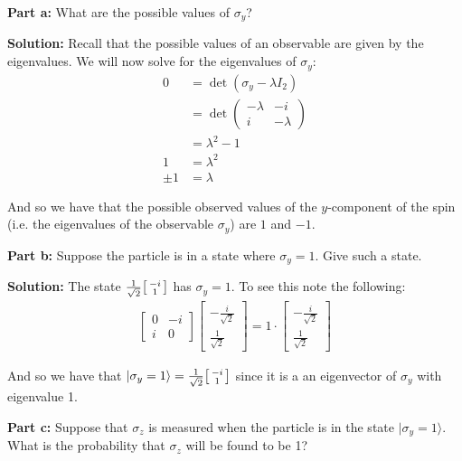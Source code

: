 \documentclass{article}
\newcommand{\icol}[1]{%
  \begin{bsmallmatrix}#1\end{bsmallmatrix}%
}
\begin{document}
\noindent\textbf{Part a:} What are the possible values of $\sigma_y$?
\bigskip

\noindent\textbf{Solution:} Recall that the possible values of an observable are given by the eigenvalues. We will now solve for the eigenvalues of $\sigma_y$:
\begin{align*}
    0&=\det(\sigma_y-\lambda I_2)\tag{characteristic equation}\\
    &=\det\begin{pmatrix}
        -\lambda&-i\\i&-\lambda
    \end{pmatrix}\\
    &=\lambda^2-1\tag{det. of $2\times2$ matrix}\\
    1&=\lambda^2\\
    \pm 1&=\lambda
\end{align*}

And so we have that the possible observed values of the $y$-component of the spin (i.e. the eigenvalues of the observable $\sigma_y$) are $1$ and $-1$.
\bigskip

\noindent\textbf{Part b:} Suppose the particle is in a state where $\sigma_y=1$. Give such a state.
\bigskip

\noindent\textbf{Solution:} The state $\frac{1}{\sqrt{2}}\icol{-i\\1}$ has $\sigma_y=1$. To see this note the following:
\begin{align*}
    \begin{bmatrix}
        0&-i\\i&0
    \end{bmatrix}\begin{bmatrix}
        -\frac{i}{\sqrt{2}}\\\frac{1}{\sqrt{2}}
    \end{bmatrix}=1\cdot\begin{bmatrix}
        -\frac{i}{\sqrt{2}}\\\frac{1}{\sqrt{2}}
    \end{bmatrix}
\end{align*} 

And so we have that $|\sigma_y=1\rangle=\frac{1}{\sqrt{2}}\icol{-i\\1}$ since it is a an eigenvector of $\sigma_y$ with eigenvalue 1.
\bigskip

\noindent\textbf{Part c:} Suppose that $\sigma_z$ is measured when the particle is in the state $|\sigma_y=1\rangle$. What is the
probability that $\sigma_z$ will be found to be 1?
\bigskip
\end{document}
